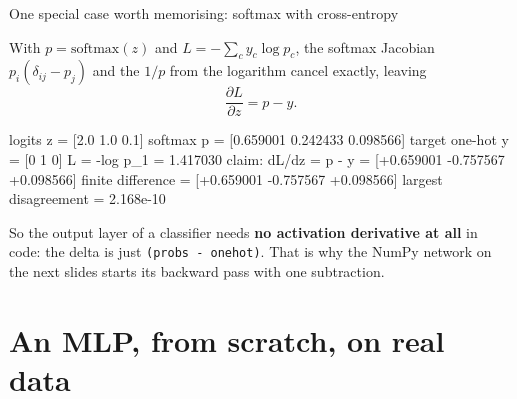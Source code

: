 \documentclass[aspectratio=169]{beamer}
\begin{document}
\begin{frame}[fragile,shrink=7]{One special case worth memorising: softmax with cross-entropy}
  \begin{block}{}
    \small
    With $p = \mathrm{softmax}(z)$ and $L = -\sum_c y_c \log p_c$, the
    softmax Jacobian $p_i(\delta_{ij} - p_j)$ and the $1/p$ from the
    logarithm cancel exactly, leaving
    \[
      \frac{\partial L}{\partial z} = p - y.
    \]
  \end{block}
\begin{outblk}
logits z          = [2.0 1.0 0.1]
softmax p         = [0.659001 0.242433 0.098566]
target one-hot y  = [0 1 0]
L = -log p_1      = 1.417030
claim: dL/dz = p - y = [+0.659001 -0.757567 +0.098566]
finite difference    = [+0.659001 -0.757567 +0.098566]
largest disagreement = 2.168e-10
\end{outblk}
  \begin{center}\small
    So the output layer of a classifier needs \textbf{no activation
    derivative at all} in code: the delta is just
    \texttt{(probs - onehot)}. That is why the NumPy network on the next
    slides starts its backward pass with one subtraction.
  \end{center}
\end{frame}

\section[Training an MLP]{An MLP, from scratch, on real data}
\label{sec:mlp}
\end{document}
